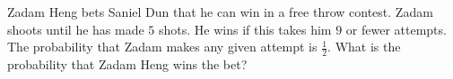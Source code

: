 Zadam Heng bets Saniel Dun that he can win in a free throw contest. Zadam shoots until he has made $5$ shots. He wins if this takes him $9$ or fewer attempts. The probability that Zadam makes any given attempt is $\frac{1}{2}$. What is the probability that Zadam Heng wins the bet?